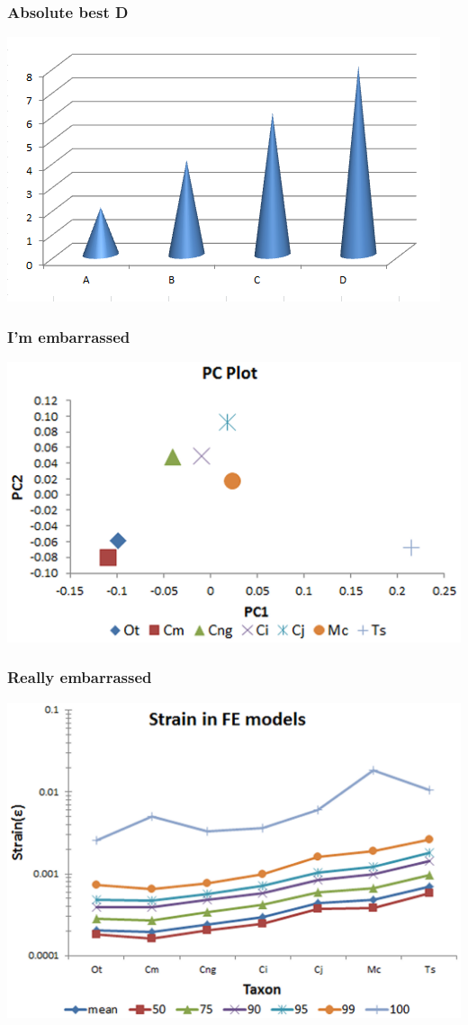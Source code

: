 \documentclass{beamer}
\begin{document}
\begin{frame}
  \frametitle{Absolute best D}
  \includegraphics[width = \textwidth, keepaspectratio = true]{figure/cones}
\end{frame}

\begin{frame}
  \frametitle{I'm embarrassed}
  \includegraphics[width = \textwidth, keepaspectratio = true]{figure/wamsley_pca}
\end{frame}

\begin{frame}
  \frametitle{Really embarrassed}
  \includegraphics[height = 0.8\textheight, keepaspectratio = true]{figure/wamsley_line}
\end{frame}
\end{document}

